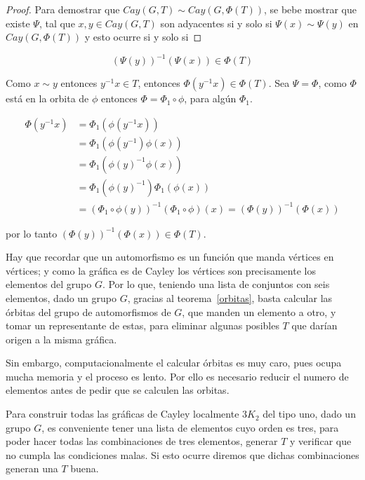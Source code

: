\documentclass[12pt]{book}
\theoremstyle{definition}
\begin{document}
\begin{proof} Para demostrar que $Cay(G,T)\sim Cay(G,\Phi(T))$, se
bebe mostrar que existe $\Psi$, tal que $x,y\in Cay(G,T)$ son
adyacentes si y solo si $\Psi(x)\sim \Psi(y)$ en $Cay(G,\Phi(T))$ y
esto ocurre si y solo si
\end{proof}

\begin{equation*}
  (\Psi(y))^{-1}(\Psi(x))\in \Phi(T)
\end{equation*}

Como $x\sim y$ entonces $y^{-1}x\in T$, entonces $\Phi(y^{-1}x) \in
\Phi(T)$. Sea $\Psi=\Phi$, como $\Phi$ está en la orbita de $\phi$
entonces $\Phi=\Phi_1\circ\phi$, para algún $\Phi_1$.

\begin{equation*}
  \begin{split}
    \Phi(y^{-1}x)&=\Phi_1(\phi(y^{-1}x))\\
    &=\Phi_1(\phi(y^{-1})\phi(x))\\
    &=\Phi_1({\phi(y)}^{-1}\phi(x))\\
    &=\Phi_1({\phi(y)}^{-1})\Phi_1(\phi(x))\\
    &=({\Phi_1\circ \phi(y)})^{-1}(\Phi_1\circ
    \phi)(x)=(\Phi(y))^{-1}(\Phi(x))
  \end{split}
\end{equation*}

por lo tanto $(\Phi(y))^{-1}(\Phi(x))\in \Phi(T)$. 

Hay que recordar que un automorfismo es un función que manda vértices
en vértices; y como la gráfica es de Cayley los vértices son
precisamente los elementos del grupo $G$. Por lo que, teniendo una
lista de conjuntos con seis elementos, dado un grupo $G$, gracias al
teorema~\ref{orbitas}, basta calcular las órbitas del grupo de
automorfismos de $G$, que manden un elemento a otro, y tomar un
representante de estas, para eliminar algunas posibles $T$ que darían
origen a la misma gráfica.

Sin embargo, computacionalmente el calcular órbitas es muy caro, pues
ocupa mucha memoria y el proceso es lento. Por ello es necesario
reducir el numero de elementos antes de pedir que se calculen las
orbitas.

Para construir todas las gráficas de Cayley localmente $3K_2$ del tipo
uno, dado un grupo $G$, es conveniente tener una lista de elementos
cuyo orden es tres, para poder hacer todas las combinaciones de tres
elementos, generar $T$ y verificar que no cumpla las condiciones
malas. Si esto ocurre diremos que dichas combinaciones generan una $T$
buena.
\end{document}
